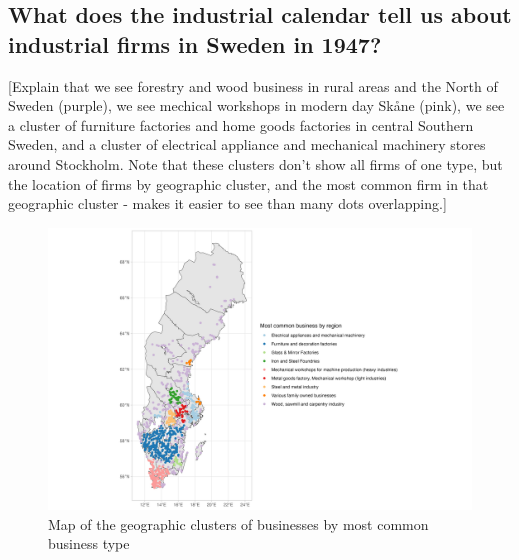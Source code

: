 \documentclass[
]{article}
\begin{document}
\hypertarget{what-does-the-industrial-calendar-tell-us-about-industrial-firms-in-sweden-in-1947}{%
\subsection{What does the industrial calendar tell us about industrial
firms in Sweden in
1947?}\label{what-does-the-industrial-calendar-tell-us-about-industrial-firms-in-sweden-in-1947}}

{[}Explain that we see forestry and wood business in rural areas and the
North of Sweden (purple), we see mechical workshops in modern day Skåne
(pink), we see a cluster of furniture factories and home goods factories
in central Southern Sweden, and a cluster of electrical appliance and
mechanical machinery stores around Stockholm. Note that these clusters
don't show all firms of one type, but the location of firms by
geographic cluster, and the most common firm in that geographic cluster
- makes it easier to see than many dots overlapping.{]}

\begin{figure}

{\centering \includegraphics[width=8.5in,height=\textheight]{assets/map_most_common_businesses.png}

}

\caption{\label{fig-common-businesses}Map of the geographic clusters of
businesses by most common business type}

\end{figure}
\end{document}
